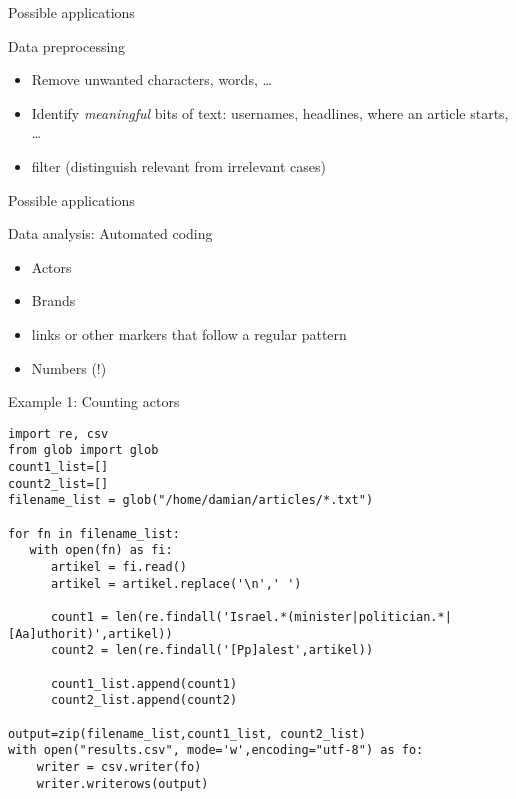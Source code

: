 \documentclass{beamer}
\begin{document}
\begin{frame}{Possible applications}
\begin{block}{Data preprocessing}
\begin{itemize}
\item Remove unwanted characters, words, \ldots
\item Identify \emph{meaningful} bits of text: usernames, headlines, where an article starts, \ldots
\item filter (distinguish relevant from irrelevant cases)
\end{itemize}
\end{block}
\end{frame}


\begin{frame}{Possible applications}
\begin{block}{Data analysis: Automated coding}
\begin{itemize}
\item Actors
\item Brands
\item links or other markers that follow a regular pattern
\item Numbers (!)
\end{itemize}
\end{block}
\end{frame}

\begin{frame}{Example 1: Counting actors}
\begin{lstlisting}
import re, csv
from glob import glob
count1_list=[]
count2_list=[]
filename_list = glob("/home/damian/articles/*.txt")

for fn in filename_list:
   with open(fn) as fi:
      artikel = fi.read()
      artikel = artikel.replace('\n',' ')
      
      count1 = len(re.findall('Israel.*(minister|politician.*|[Aa]uthorit)',artikel))
      count2 = len(re.findall('[Pp]alest',artikel))

      count1_list.append(count1)
      count2_list.append(count2)
      
output=zip(filename_list,count1_list, count2_list)
with open("results.csv", mode='w',encoding="utf-8") as fo:
    writer = csv.writer(fo)
    writer.writerows(output)
\end{lstlisting}
\end{frame}
\end{document}
